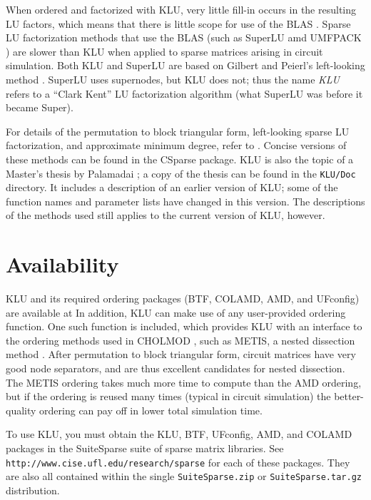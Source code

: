 \documentclass[11pt]{article}
\begin{document}
When ordered and factorized with KLU, very little fill-in occurs in the
resulting LU factors, which means that there is little scope for use of the
BLAS \cite{ACM679a}.  Sparse LU factorization methods that use the BLAS (such
as SuperLU \cite{SuperLU99} amd UMFPACK \cite{Davis03_algo,Davis03}) are slower
than KLU when applied to sparse matrices arising in circuit simulation.  Both
KLU and SuperLU are based on Gilbert and Peierl's left-looking method
\cite{GilbertPeierls88}.  SuperLU uses supernodes, but KLU does not; thus the
name {\em KLU} refers to a ``Clark Kent'' LU factorization algorithm (what
SuperLU was before it became Super).

For details of the permutation to block triangular form, left-looking sparse
LU factorization, and approximate minimum degree, refer to \cite{Davis06book}.
Concise versions of these methods can be found in the CSparse package.  KLU is
also the topic of a Master's thesis by Palamadai \cite{Palamadai05}; a copy of
the thesis can be found in the {\tt KLU/Doc} directory.  It includes a
description of an earlier version of KLU; some of the function names and
parameter lists have changed in this version.  The descriptions of the methods
used still applies to the current version of KLU, however.

\section{Availability}

KLU and its required ordering packages (BTF, COLAMD, AMD, and UFconfig) are
available at   In
addition, KLU can make use of any user-provided ordering function.  One such
function is included, which provides KLU with an interface to the ordering
methods used in CHOLMOD \cite{ChenDavisHagerRajamanickam06}, such as METIS, a
nested dissection method \cite{KarypisKumar98e}.  After permutation to block
triangular form, circuit matrices have very good node separators, and are thus
excellent candidates for nested dissection.  The METIS ordering takes much more
time to compute than the AMD ordering, but if the ordering is reused many times
(typical in circuit simulation) the better-quality ordering can pay off in
lower total simulation time. 

To use KLU, you must obtain the KLU, BTF, UFconfig, AMD, and COLAMD packages
in the SuiteSparse suite of sparse matrix libraries.  See 
{\tt http://www.cise.ufl.edu/research/sparse} for each of these packages.
They are also all contained within the single {\tt SuiteSparse.zip} or
{\tt SuiteSparse.tar.gz} distribution.
\end{document}
